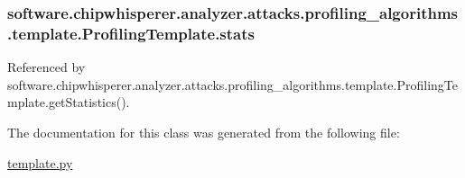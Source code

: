 \subsubsection[{stats}]{\setlength{\rightskip}{0pt plus 5cm}software.\+chipwhisperer.\+analyzer.\+attacks.\+profiling\+\_\+algorithms.\+template.\+Profiling\+Template.\+stats}\label{classsoftware_1_1chipwhisperer_1_1analyzer_1_1attacks_1_1profiling__algorithms_1_1template_1_1ProfilingTemplate_a23bdc3d599b21c33f56bb6cf2e29fb16}


Referenced by software.\+chipwhisperer.\+analyzer.\+attacks.\+profiling\+\_\+algorithms.\+template.\+Profiling\+Template.\+get\+Statistics().



The documentation for this class was generated from the following file\+:\begin{DoxyCompactItemize}
\item 
\hyperlink{template_8py}{template.\+py}\end{DoxyCompactItemize}
